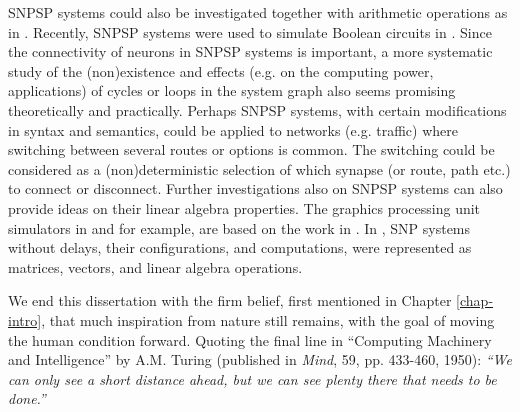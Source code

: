 

SNPSP systems could also be investigated together with arithmetic operations as in \cite{snp-arithm}.
Recently, SNPSP systems were used to simulate Boolean circuits in \cite{snpsp-ckt}.
Since the connectivity of neurons in SNPSP systems is important, a more systematic study of the (non)existence and effects (e.g. on the computing power, applications) of cycles or loops in the system graph also seems promising theoretically and practically.
Perhaps SNPSP systems, with certain modifications in syntax and semantics, could be applied to networks (e.g. traffic) where switching between several routes or options is common.
The switching could be considered as a (non)deterministic selection of which synapse (or route, path etc.) to connect or disconnect.
Further investigations also on SNPSP systems can also provide ideas on their linear algebra properties.
The graphics processing unit simulators in \cite{snpgpu-cmc} and \cite{snpgpu-romjist} for example, are based on the work in \cite{snpmatlncs}.
In \cite{snpmatlncs}, SNP systems without delays, their configurations, and computations, were represented as matrices, vectors, and linear algebra operations.





We end this dissertation with the firm belief, first mentioned in Chapter \ref{chap-intro}, that  much inspiration from nature still remains, with the goal of moving the human condition forward.
Quoting the final line in ``Computing Machinery and Intelligence'' by A.M. Turing (published in \textit{Mind}, 59, pp. 433-460, 1950):
\textit{``We can only see a short distance ahead, but we can see plenty there that needs to be done.''}
